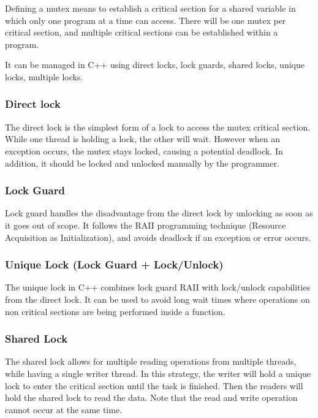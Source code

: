 \documentclass[conference]{IEEEtran}
\begin{document}
Defining a mutex means to establish a critical section for a shared variable in which only one program at a time can access. There will be one mutex per critical section, and multiple critical sections can be established within a program.

It can be managed in C++ using direct locks, lock guards, shared locks, unique locks, multiple locks. 

\subsubsection{Direct lock}

The direct lock is the simplest form of a lock to access the mutex critical section. While one thread is holding a lock, the other will wait. However when an exception occurs, the mutex stays locked, causing a potential deadlock. In addition, it should be locked and unlocked manually by the programmer.

\subsubsection{Lock Guard}

Lock guard handles the disadvantage from the direct lock by unlocking as soon as it goes out of scope. It follows the RAII programming technique (Resource Acquisition as Initialization), and avoids deadlock if an exception or error occurs.

\subsubsection{Unique Lock (Lock Guard + Lock/Unlock)}

The unique lock in C++ combines lock guard RAII with lock/unlock capabilities from the direct lock. It can be used to avoid long wait times where operations on non critical sections are being performed inside a function.

\subsubsection{Shared Lock}

The shared lock allows for multiple reading operations from multiple threads, while having a single writer thread. In this strategy, the writer will hold a unique lock to enter the critical section until the task is finished. Then the readers will hold the shared lock to read the data. Note that the read and write operation cannot occur at the same time.
\end{document}
